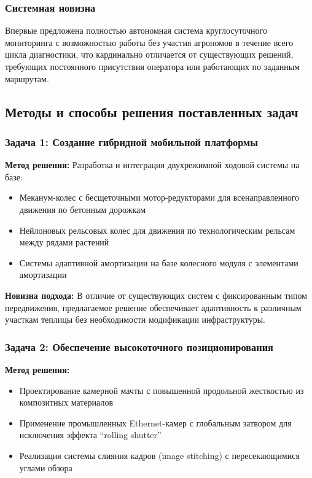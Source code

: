 \documentclass[12pt,a4paper]{article}
\begin{document}
\subsubsection{Системная новизна}
Впервые предложена полностью автономная система круглосуточного мониторинга с возможностью работы без участия агрономов в течение всего цикла диагностики, что кардинально отличается от существующих решений, требующих постоянного присутствия оператора или работающих по заданным маршрутам.

\subsection{Методы и способы решения поставленных задач}

\subsubsection{Задача 1: Создание гибридной мобильной платформы}
\textbf{Метод решения:} Разработка и интеграция двухрежимной ходовой системы на базе:
\begin{itemize}
    \item Меканум-колес с бесщеточными мотор-редукторами для всенаправленного движения по бетонным дорожкам
    \item Нейлоновых рельсовых колес для движения по технологическим рельсам между рядами растений
    \item Системы адаптивной амортизации на базе колесного модуля с элементами амортизации
\end{itemize}

\textbf{Новизна подхода:} В отличие от существующих систем с фиксированным типом передвижения, предлагаемое решение обеспечивает адаптивность к различным участкам теплицы без необходимости модификации инфраструктуры.

\subsubsection{Задача 2: Обеспечение высокоточного позиционирования}
\textbf{Метод решения:}
\begin{itemize}
    \item Проектирование камерной мачты с повышенной продольной жесткостью из композитных материалов
    \item Применение промышленных Ethernet-камер с глобальным затвором для исключения эффекта ``rolling shutter''
    \item Реализация системы слияния кадров (image stitching) с пересекающимися углами обзора
\end{itemize}
\end{document}
